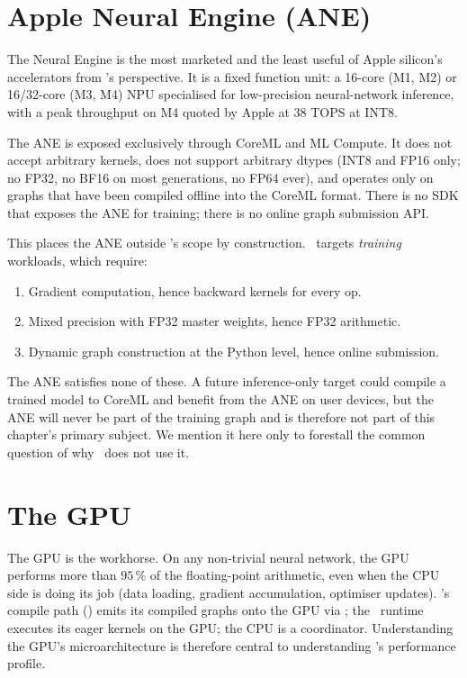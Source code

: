 \section{Apple Neural Engine (ANE)}
\label{sec:apple_silicon:ane}

The Neural Engine is the most marketed and the least useful of Apple
silicon's accelerators from \Lucid's perspective. It is a fixed
function unit: a 16-core (M1, M2) or 16/32-core (M3, M4) NPU
specialised for low-precision neural-network inference, with a peak
throughput on M4 quoted by Apple at $38$ TOPS at INT8.

The ANE is exposed exclusively through CoreML and ML Compute. It does
not accept arbitrary kernels, does not support arbitrary dtypes
(INT8 and FP16 only; no FP32, no BF16 on most generations, no FP64
ever), and operates only on graphs that have been compiled offline
into the CoreML format. There is no SDK that exposes the ANE for
training; there is no online graph submission API.

This places the ANE outside \Lucid's scope by construction. \Lucid\
targets \emph{training} workloads, which require:
\begin{enumerate}
  \item Gradient computation, hence backward kernels for every op.
  \item Mixed precision with FP32 master weights, hence FP32
    arithmetic.
  \item Dynamic graph construction at the Python level, hence online
    submission.
\end{enumerate}
The ANE satisfies none of these. A future inference-only
 target could compile a trained model to CoreML
and benefit from the ANE on user devices, but the ANE will never be
part of the training graph and is therefore not part of this
chapter's primary subject. We mention it here only to forestall the
common question of why \Lucid\ does not use it.

\section{The GPU}
\label{sec:apple_silicon:gpu}

The GPU is the workhorse. On any non-trivial neural network, the GPU
performs more than $95\,\%$ of the floating-point arithmetic, even
when the CPU side is doing its job (data loading, gradient
accumulation, optimiser updates). \Lucid's compile path
() emits its compiled graphs onto the
GPU via \MPSGraph; the \MLX\ runtime executes its eager kernels on
the GPU; the CPU is a coordinator. Understanding the GPU's
microarchitecture is therefore central to understanding \Lucid's
performance profile.

